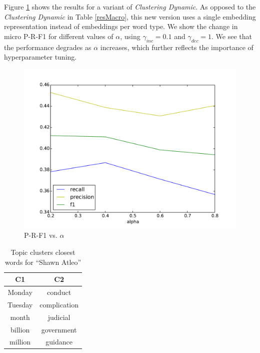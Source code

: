 \documentclass{article}
\begin{document}
{{%

Figure \ref{varyingalpha} shows the results for a variant of {\textit{Clustering Dynamic}}. As opposed to the {\textit{Clustering Dynamic}} in Table \ref{resMacro}, this new version uses a single embedding representation instead of embeddings per word type. We show the change in micro P-R-F1 for different values of $\alpha$, using $\gamma_{inc}=0.1$ and $\gamma_{dec}=1$. We see that the performance degrades as $\alpha$ increases, which further reflects the importance of hyperparameter tuning.

\begin{figure}[tb]
\centering
\includegraphics[width=0.8\columnwidth]{fig/alphaPlotMacro.pdf}
\caption{P-R-F1 vs. $\alpha$}
\label{varyingalpha}
\end{figure}

\begin{table}[tb]
\center
\begin{tabular}{cc}
\toprule
\textbf{C1} & \textbf{C2} \\
\midrule
Monday & conduct \\ %
Tuesday & complication \\ %
month & judicial \\ %
billion & government \\ %
million & guidance \\
\bottomrule
\end{tabular}
\caption{Topic clusters closest words for ``Shawn Atleo''}
\label{clusterresult}
\end{table}

}}
\end{document}
